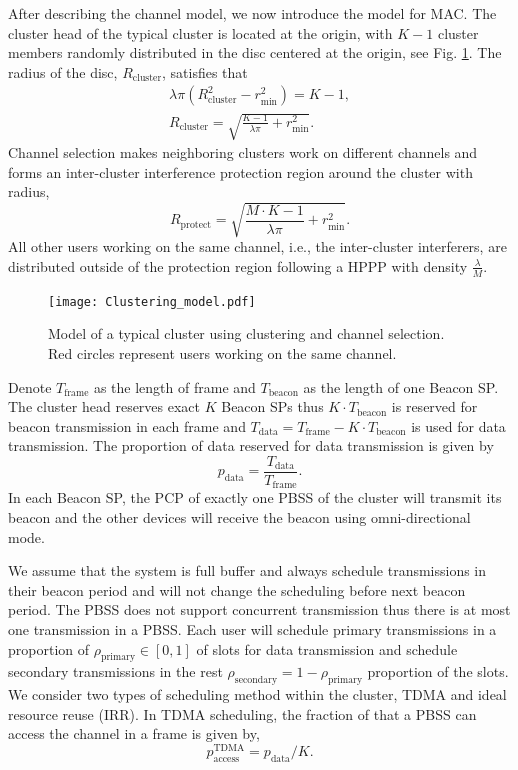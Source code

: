 \documentclass[10pt, conference, letterpaper]{IEEEtran}
\begin{document}
After describing the channel model, we now introduce the model for MAC. 
The cluster head of the typical cluster is located at the origin, with $K-1$ cluster members randomly distributed in the disc centered at the origin, see Fig. \ref{fig:clusteranalysis:model}. The radius of the disc, $R_{\mathrm{cluster}}$, satisfies that 
\begin{align*}
\lambda\pi (R_{\mathrm{cluster}}^2 - r_{\min}^2) = K - 1,\\
R_{\mathrm{cluster}} = \sqrt{\frac{K - 1}{\lambda\pi}+r_{\min}^2}.
\end{align*}
Channel selection makes neighboring clusters work on different channels and forms an inter-cluster interference protection region around the cluster with radius, 
\begin{equation*}
R_{\mathrm{protect}} = \sqrt{\frac{M\cdot K - 1}{\lambda \pi} + r_{\min}^2}.
\end{equation*}
All other users working on the same channel, i.e., the inter-cluster interferers, are distributed outside of the protection region following a HPPP with density $\frac{\lambda}{M}$.

\begin{figure}
	\centering
	\texttt{[image: Clustering\_model.pdf]}
	\caption{Model of a typical cluster using clustering and channel selection. Red circles represent users working on the same channel.}
	\label{fig:clusteranalysis:model}
\end{figure}

Denote $T_{\mathrm{frame}}$ as the length of frame and $T_{\mathrm{beacon}}$ as the length of one Beacon SP. The cluster head reserves exact $K$ Beacon SPs thus $K\cdot T_{\mathrm{beacon}}$ is reserved for beacon transmission in each frame and $T_{\mathrm{data}} = T_{\mathrm{frame}} - K\cdot T_{\mathrm{beacon}}$ is used for data transmission. The proportion of data reserved for data transmission is given by
\begin{equation*}
p_{\mathrm{data}} = \frac{T_{\mathrm{data}}}{T_{\mathrm{frame}}}.
\end{equation*}
In each Beacon SP, the PCP of exactly one PBSS of the cluster will transmit its beacon and the other devices will receive the beacon using omni-directional mode. 

We assume that the system is full buffer and always schedule transmissions in their beacon period and will not change the scheduling before next beacon period. The PBSS does not support concurrent transmission thus there is at most one transmission in a PBSS. Each user will schedule primary transmissions in a proportion of $\rho_{\mathrm{primary}}\in[0,1]$ of slots for data transmission and schedule secondary transmissions in the rest $\rho_{\mathrm{secondary}} =1 - \rho_{\mathrm{primary}}$ proportion of the slots. 
We consider two types of scheduling method within the cluster, TDMA and ideal resource reuse (IRR). In TDMA scheduling, the fraction of that a PBSS can access the channel in a frame is given by, 
\begin{equation*}
p_{\mathrm{access}}^{\mathrm{TDMA}} = p_{\mathrm{data}}/K.
\end{equation*}
\end{document}
